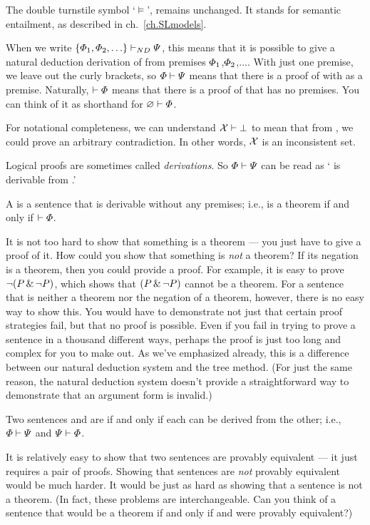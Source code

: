 The {double turnstile} symbol `$\models$', remains unchanged. It stands for semantic entailment, as described in ch.~\ref{ch.SLmodels}.

When we write $\{\varPhi{}_1,\varPhi{}_2,\ldots\}\vdash_{ND}\varPsi{}$, this means that it is possible to give a natural deduction derivation of \metaB{} from premises $\varPhi{}_1$,$\varPhi{}_2$,$\ldots$. With just one premise, we leave out the curly brackets, so $\varPhi{}\vdash\varPsi{}$ means that there is a proof of \metaB{} with \metaA{} as a premise. Naturally, $\vdash\varPhi{}$ means that there is a proof of \metaA{} that has no premises. You can think of it as shorthand for $\varnothing\vdash\varPhi{}$. 

For notational completeness, we can understand $\mathcal{X}{}\vdash\bot$ to mean that from \metaSetX{}, we could prove an arbitrary contradiction. In other words, $\mathcal{X}{}$ is an inconsistent set.

Logical proofs are sometimes called \emph{derivations}. So $\varPhi{}\vdash\varPsi{}$ can be read as `\metaB{} is derivable from \metaA{}.'

A  is a sentence that is derivable without any premises; i.e., \metaA{} is a theorem if and only if $\vdash\varPhi{}$.

It is not too hard to show that something is a theorem --- you just have to give a proof of it. How could you show that something is \emph{not} a theorem? If its negation is a theorem, then you could provide a proof. For example, it is easy to prove $\neg(P \,\&\, \neg P)$, which shows that $(P \,\&\, \neg P)$ cannot be a theorem. For a sentence that is neither a theorem nor the negation of a theorem, however, there is no easy way to show this. You would have to demonstrate not just that certain proof strategies fail, but that no proof is possible. Even if you fail in trying to prove a sentence in a thousand different ways, perhaps the proof is just too long and complex for you to make out. As we've emphasized already, this is a difference between our natural deduction system and the tree method. (For just the same reason, the natural deduction system doesn't provide a straightforward way to demonstrate that an argument form is invalid.)

Two sentences \metaA{} and \metaB{} are  if and only if each can be derived from the other; i.e., $\varPhi{}\vdash\varPsi{}$ and $\varPsi{}\vdash\varPhi{}$.

It is relatively easy to show that two sentences are provably equivalent --- it just requires a pair of proofs. Showing that sentences are \emph{not} provably equivalent would be much harder. It would be just as hard as showing that a sentence is not a theorem. (In fact, these problems are interchangeable. Can you think of a sentence that would be a theorem if and only if \metaA{} and \metaB{} were provably equivalent?)

